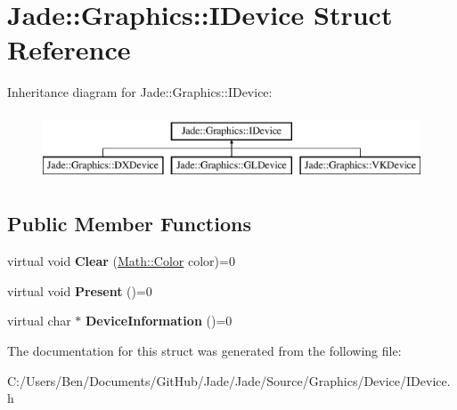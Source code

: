 \hypertarget{struct_jade_1_1_graphics_1_1_i_device}{}\section{Jade\+:\+:Graphics\+:\+:I\+Device Struct Reference}
\label{struct_jade_1_1_graphics_1_1_i_device}
Inheritance diagram for Jade\+:\+:Graphics\+:\+:I\+Device\+:\begin{figure}[H]
\begin{center}
\leavevmode
\includegraphics[height=2.000000cm]{struct_jade_1_1_graphics_1_1_i_device}
\end{center}
\end{figure}
\subsection*{Public Member Functions}
\begin{DoxyCompactItemize}
\item 
\hypertarget{struct_jade_1_1_graphics_1_1_i_device_ab898bda6f3b99c18b4c4dd939ec3b138}{}virtual void {\bfseries Clear} (\hyperlink{struct_jade_1_1_math_1_1_color}{Math\+::\+Color} color)=0\label{struct_jade_1_1_graphics_1_1_i_device_ab898bda6f3b99c18b4c4dd939ec3b138}

\item 
\hypertarget{struct_jade_1_1_graphics_1_1_i_device_a67c38c0ca3031f1e959cf569ba25fec3}{}virtual void {\bfseries Present} ()=0\label{struct_jade_1_1_graphics_1_1_i_device_a67c38c0ca3031f1e959cf569ba25fec3}

\item 
\hypertarget{struct_jade_1_1_graphics_1_1_i_device_a4ef23421fe5c8bcd09731a1d38eda78f}{}virtual char $\ast$ {\bfseries Device\+Information} ()=0\label{struct_jade_1_1_graphics_1_1_i_device_a4ef23421fe5c8bcd09731a1d38eda78f}

\end{DoxyCompactItemize}


The documentation for this struct was generated from the following file\+:\begin{DoxyCompactItemize}
\item 
C\+:/\+Users/\+Ben/\+Documents/\+Git\+Hub/\+Jade/\+Jade/\+Source/\+Graphics/\+Device/I\+Device.\+h\end{DoxyCompactItemize}
